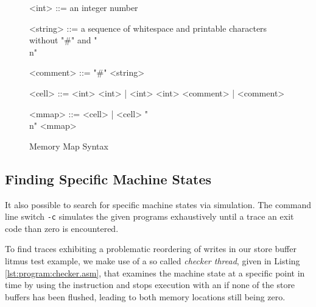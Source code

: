 \begin{figure}[h]
\begin{grammar}
\small

<int> ::= an integer number

<string> ::= a sequence of whitespace and printable characters without "#" and "\\n"

<comment> ::= "#" <string>

<cell> ::= <int> <int> | <int> <int> <comment> | <comment>

<mmap> ::= <cell> | <cell> "\\n" <mmap>
\end{grammar}
\caption{Memory Map Syntax}
\label{fig:syntax:mmap}
\end{figure}

\subsection*{Finding Specific Machine States}

It also possible to search for specific machine states via simulation.
The command line switch \texttt{-c} simulates the given programs exhaustively until a trace  an exit code  than zero is encountered.



To find traces exhibiting a problematic reordering of writes in our store buffer litmus test example, we make use of a so called \emph{checker thread}, given in Listing \ref{lst:program:checker.asm}, that examines the machine state at a specific point in time by using the  instruction and stops execution with an  if none of the store buffers has been flushed, leading to both memory locations still being zero.



